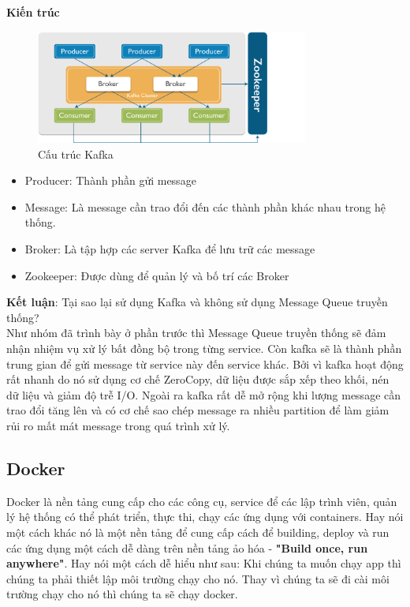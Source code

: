             \textbf{Kiến trúc}
            
             \begin{figure}[H]   			\includegraphics[width=0.8\textwidth]{Images/Kafka2.png}
    		\centering
    		\linebreak
    		\caption{Cấu trúc Kafka}
            \end{figure}
            
            \begin{itemize}
                \item Producer: Thành phần gửi message
                \item Message: Là message cần trao đổi đến các thành phần khác nhau trong hệ thống.
                \item Broker: Là tập hợp các server Kafka để lưu trữ các message
                \item Zookeeper: Được dùng để quản lý và bố trí các Broker
            \end{itemize}
            
    
          	\textbf{Kết luận}: Tại sao lại sử dụng Kafka và không sử dụng Message Queue truyền thống? \\
            
            Như nhóm đã trình bày ở phần trước thì Message Queue truyền thống sẽ đảm nhận nhiệm vụ xử lý bất đồng bộ trong từng service. Còn kafka sẽ là thành phần trung gian để gửi message từ service này đến service khác. Bởi vì kafka hoạt động rất nhanh do nó sử dụng cơ chế ZeroCopy, dữ liệu được sắp xếp theo khối, nén dữ liệu và giảm độ trễ I/O. Ngoài ra kafka rất dễ mở rộng khi lượng message cần trao đổi tăng lên và có cơ chế sao chép message ra nhiều partition để làm giảm rủi ro mất mát message trong quá trình xử lý.
            
            \subsection{Docker}
            
            Docker là nền tảng cung cấp cho các công cụ, service để các lập trình viên, quản lý hệ thống có thể phát triển, thực thi, chạy các ứng dụng với containers. Hay nói một cách khác nó là một nền tảng để cung cấp cách để building, deploy và run các ứng dụng một cách dễ dàng trên nền tảng ảo hóa - \textbf{"Build once, run anywhere"}. Hay nói một cách dễ hiểu như sau: Khi chúng ta muốn chạy app thì chúng ta phải thiết lập môi trường chạy cho nó. Thay vì chúng ta sẽ đi cài môi trường chạy cho nó thì chúng ta sẽ chạy docker.\\
            
